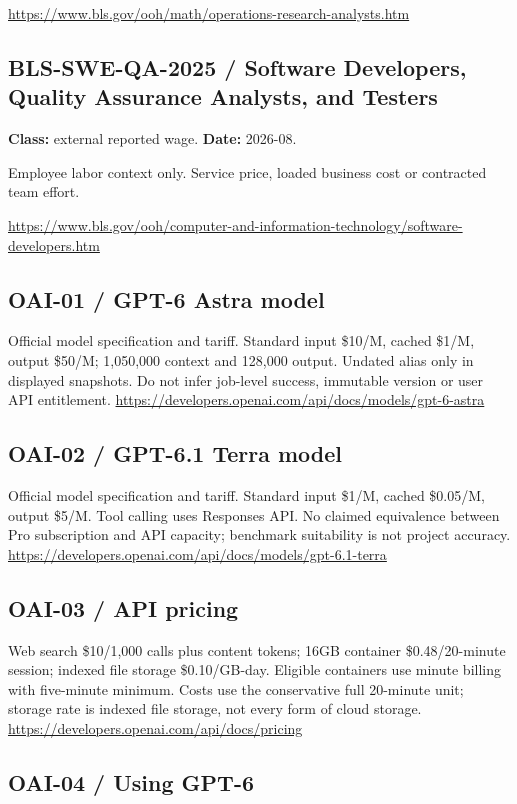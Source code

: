 \documentclass[10pt]{article}
\begin{document}
\url{https://www.bls.gov/ooh/math/operations-research-analysts.htm}

\subsection*{BLS-SWE-QA-2025 / Software Developers, Quality Assurance Analysts, and Testers}

\textbf{Class:} external reported wage. \textbf{Date:} 2026-08.

Employee labor context only. Service price, loaded business cost or contracted team effort.

\url{https://www.bls.gov/ooh/computer-and-information-technology/software-developers.htm}

\subsection*{OAI-01 / GPT-6 Astra model}

Official model specification and tariff. Standard input \$10/M, cached \$1/M, output \$50/M; 1,050,000 context and 128,000 output. Undated alias only in displayed snapshots. Do not infer job-level success, immutable version or user API entitlement. \url{https://developers.openai.com/api/docs/models/gpt-6-astra}

\subsection*{OAI-02 / GPT-6.1 Terra model}

Official model specification and tariff. Standard input \$1/M, cached \$0.05/M, output \$5/M. Tool calling uses Responses API. No claimed equivalence between Pro subscription and API capacity; benchmark suitability is not project accuracy. \url{https://developers.openai.com/api/docs/models/gpt-6.1-terra}

\subsection*{OAI-03 / API pricing}

Web search \$10/1,000 calls plus content tokens; 16GB container \$0.48/20-minute session; indexed file storage \$0.10/GB-day. Eligible containers use minute billing with five-minute minimum. Costs use the conservative full 20-minute unit; storage rate is indexed file storage, not every form of cloud storage. \url{https://developers.openai.com/api/docs/pricing}

\subsection*{OAI-04 / Using GPT-6}
\end{document}
